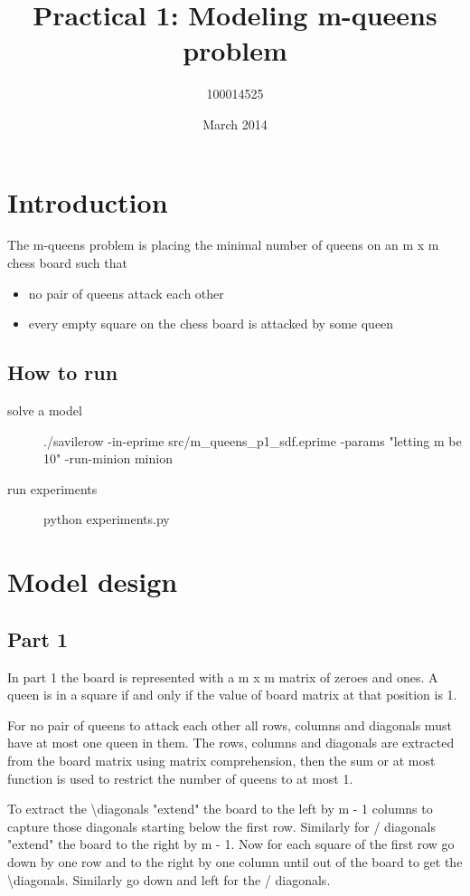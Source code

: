 \documentclass{article}
\title{Practical 1: Modeling m-queens problem}
\author{100014525}
\date{March 2014}
\begin{document}
\maketitle

\section{Introduction}
The m-queens problem is placing the minimal number of queens on an m x m chess board such that
\begin{itemize}
	\item no pair of queens attack each other
	\item every empty square on the chess board is attacked by some queen
\end{itemize}

\subsection{How to run}
\begin{description}
	\item[solve a model] ./savilerow -in-eprime src/m\_queens\_p1\_sdf.eprime -params "letting m be 10" -run-minion minion
	\item[run experiments] python experiments.py
\end{description}

\section{Model design}
\subsection{Part 1}

In part 1 the board is represented with a m x m matrix of zeroes and ones. A queen is in a square if and only if the value of board matrix at that position is 1.

For no pair of queens to attack each other all rows, columns and diagonals must have at most one queen in them. The rows, columns and diagonals are extracted from the board matrix using matrix comprehension, then the sum or at most function is used to restrict the number of queens to at most 1.

To extract the \textbackslash \space diagonals "extend" the board to the left by m - 1 columns to capture those diagonals starting below the first row. Similarly for / diagonals "extend" the board to the right by m - 1. Now for each square of the first row go down by one row and to the right by one column until out of the board to get the \textbackslash \space diagonals. Similarly go down and left for the / diagonals.
\end{document}
